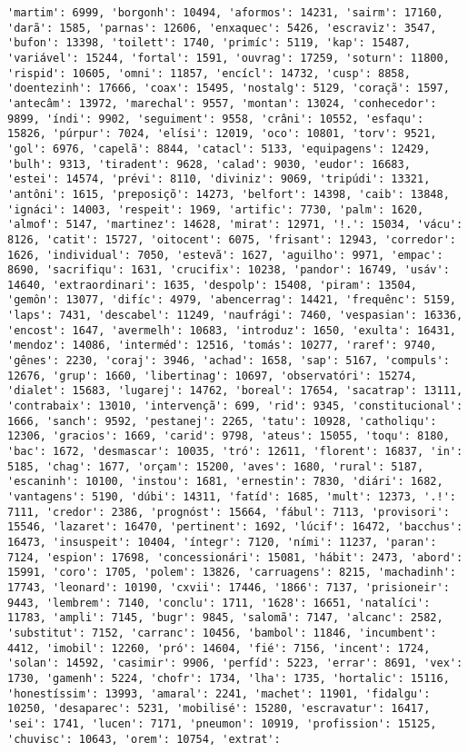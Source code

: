 \begin{Verbatim}[commandchars=\\\{\}]
'martim': 6999, 'borgonh': 10494, 'aformos': 14231, 'sairm': 17160, 'darã': 1585, 'parnas': 12606, 'enxaquec': 5426, 'escraviz': 3547, 'bufon': 13398, 'toilett': 1740, 'primíc': 5119, 'kap': 15487, 'variável': 15244, 'fortal': 1591, 'ouvrag': 17259, 'soturn': 11800, 'rispid': 10605, 'omni': 11857, 'encícl': 14732, 'cusp': 8858, 'doentezinh': 17666, 'coax': 15495, 'nostalg': 5129, 'coraçã': 1597, 'antecâm': 13972, 'marechal': 9557, 'montan': 13024, 'conhecedor': 9899, 'índi': 9902, 'seguiment': 9558, 'crâni': 10552, 'esfaqu': 15826, 'púrpur': 7024, 'elísi': 12019, 'oco': 10801, 'torv': 9521, 'gol': 6976, 'capelã': 8844, 'catacl': 5133, 'equipagens': 12429, 'bulh': 9313, 'tiradent': 9628, 'calad': 9030, 'eudor': 16683, 'estei': 14574, 'prévi': 8110, 'diviniz': 9069, 'tripúdi': 13321, 'antôni': 1615, 'preposiçõ': 14273, 'belfort': 14398, 'caib': 13848, 'ignáci': 14003, 'respeit': 1969, 'artific': 7730, 'palm': 1620, 'almof': 5147, 'martinez': 14628, 'mirat': 12971, '!.': 15034, 'vácu': 8126, 'catit': 15727, 'oitocent': 6075, 'frisant': 12943, 'corredor': 1626, 'individual': 7050, 'estevã': 1627, 'aguilho': 9971, 'empac': 8690, 'sacrifiqu': 1631, 'crucifix': 10238, 'pandor': 16749, 'usáv': 14640, 'extraordinari': 1635, 'despolp': 15408, 'piram': 13504, 'gemôn': 13077, 'difíc': 4979, 'abencerrag': 14421, 'frequênc': 5159, 'laps': 7431, 'descabel': 11249, 'naufrági': 7460, 'vespasian': 16336, 'encost': 1647, 'avermelh': 10683, 'introduz': 1650, 'exulta': 16431, 'mendoz': 14086, 'interméd': 12516, 'tomás': 10277, 'raref': 9740, 'gênes': 2230, 'coraj': 3946, 'achad': 1658, 'sap': 5167, 'compuls': 12676, 'grup': 1660, 'libertinag': 10697, 'observatóri': 15274, 'dialet': 15683, 'lugarej': 14762, 'boreal': 17654, 'sacatrap': 13111, 'contrabaix': 13010, 'intervençã': 699, 'rid': 9345, 'constitucional': 1666, 'sanch': 9592, 'pestanej': 2265, 'tatu': 10928, 'catholiqu': 12306, 'gracios': 1669, 'carid': 9798, 'ateus': 15055, 'toqu': 8180, 'bac': 1672, 'desmascar': 10035, 'tró': 12611, 'florent': 16837, 'in': 5185, 'chag': 1677, 'orçam': 15200, 'aves': 1680, 'rural': 5187, 'escaninh': 10100, 'instou': 1681, 'ernestin': 7830, 'diári': 1682, 'vantagens': 5190, 'dúbi': 14311, 'fatíd': 1685, 'mult': 12373, '.!': 7111, 'credor': 2386, 'prognóst': 15664, 'fábul': 7113, 'provisori': 15546, 'lazaret': 16470, 'pertinent': 1692, 'lúcif': 16472, 'bacchus': 16473, 'insuspeit': 10404, 'íntegr': 7120, 'ními': 11237, 'paran': 7124, 'espion': 17698, 'concessionári': 15081, 'hábit': 2473, 'abord': 15991, 'coro': 1705, 'polem': 13826, 'carruagens': 8215, 'machadinh': 17743, 'leonard': 10190, 'cxvii': 17446, '1866': 7137, 'prisioneir': 9443, 'lembrem': 7140, 'conclu': 1711, '1628': 16651, 'natalíci': 11783, 'ampli': 7145, 'bugr': 9845, 'salomã': 7147, 'alcanc': 2582, 'substitut': 7152, 'carranc': 10456, 'bambol': 11846, 'incumbent': 4412, 'imobil': 12260, 'pró': 14604, 'fié': 7156, 'incent': 1724, 'solan': 14592, 'casimir': 9906, 'perfíd': 5223, 'errar': 8691, 'vex': 1730, 'gamenh': 5224, 'chofr': 1734, 'lha': 1735, 'hortalic': 15116, 'honestíssim': 13993, 'amaral': 2241, 'machet': 11901, 'fidalgu': 10250, 'desaparec': 5231, 'mobilisé': 15280, 'escravatur': 16417, 'sei': 1741, 'lucen': 7171, 'pneumon': 10919, 'profission': 15125, 'chuvisc': 10643, 'orem': 10754, 'extrat': 
\end{Verbatim}

